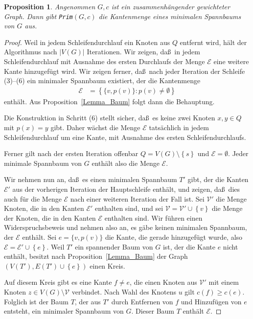 \documentclass[10pt,reqno]{amsart}
\numberwithin{equation}{section}
\newcommand\cE{\mathcal E}
\newcommand\cV{\mathcal V}
\newtheorem{proposition}[definition]{Proposition}
\newcommand\cbc[1]{\left\{{#1}\right\}}
\newcommand\Prop{Proposition}
\begin{document}
\begin{proposition}\label{prop_prim}
	Angenommen $G,c$ ist ein zusammenh\"angender gewichteter Graph.
	Dann gibt {\tt Prim}$(G,c)$ die Kantenmenge eines minimalen Spannbaums von $G$ aus.
\end{proposition}
\begin{proof}
	Weil in jedem Schleifendurchlauf ein Knoten aus $Q$ entfernt wird, h\"alt der Algorithmus nach $|V(G)|$ Iterationen.
	Wir zeigen, da\ss\ in jedem Schleifendurchlauf mit Ausnahme des ersten Durchlaufs der Menge $\cE$ eine weitere Kante hinzugef\"ugt wird.
	Wir zeigen ferner, da\ss\ nach jeder Iteration der Schleife (3)--(6) ein minimaler Spannbaum existiert, der die Kantenmenge
	\begin{align*}
		\cE&=\cbc{\{v,p(v)\}:p(v)\neq\emptyset}
	\end{align*}
	enth\"alt.
	Aus \Prop~\ref{Lemma_Baum} folgt dann die Behauptung.

	Die Konstruktion in Schritt (6) stellt sicher, da\ss\ es keine zwei Knoten $x,y\in Q$ mit $p(x)=y$ gibt.
	Daher w\"achst die Menge $\cE$ tats\"achlich in jedem Schleifendurchlauf um eine Kante, mit Ausnahme des ersten Schleifendurchlaufs.

	Ferner gilt nach der ersten Iteration offenbar $Q=V(G)\setminus\cbc s$ und $\cE=\emptyset$.
	Jeder minimale Spannbaum von $G$ enth\"alt also die Menge $\cE$.
	
	Wir nehmen nun an, da\ss\ es einen minimalen Spannbaum $T'$ gibt, der die Kanten $\cE'$ aus der vorherigen Iteration der Hauptschleife enth\"alt, und zeigen, da\ss\ dies auch f\"ur die Menge $\cE$ nach einer weiteren Iteration der Fall ist.
	Sei $\cV'$ die Menge Knoten, die in den Kanten $\cE'$ enthalten sind, und sei $\cV=\cV'\cup\cbc v$ die Menge der Knoten, die in den Kanten $\cE$ enthalten sind.
	Wir f\"uhren einen Widerspruchsbeweis und nehmen also an, es g\"abe keinen minimalen Spannbaum, der $\cE$ enth\"alt.
	Sei $e=\{v,p(v)\}$ die Kante, die gerade hinzugef\"ugt wurde, also $\cE=\cE'\cup\cbc e$.
	Weil $T'$ ein spannender Baum von $G$ ist, der die Kante $e$ nicht enth\"alt, besitzt nach \Prop~\ref{Lemma_Baum} der Graph $(V(T'),E(T')\cup\cbc e)$ einen Kreis.

	Auf diesem Kreis gibt es eine Kante $f\neq e$, die einen Knoten aus $\cV'$ mit einem Knoten $z\in V(G)\setminus\cV$ verbindet.
	Nach Wahl des Knotens $u$ gilt $c(f)\geq c(e)$.
	Folglich ist der Baum $T$, der aus $T'$ durch Entfernen von $f$ und Hinzuf\"ugen von $e$ entsteht, ein minimaler Spannbaum von $G$.
	Dieser Baum $T$ enth\"alt $\cE$.
\end{proof}
\end{document}
